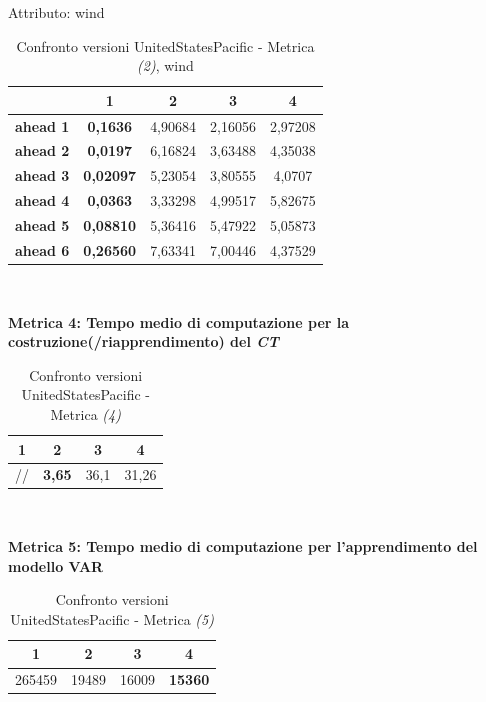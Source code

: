 \documentclass[12pt,a4paper,oneside,openright]{book}
\begin{document}
\medskip

Attributo: wind \\ 

\begin{table}[H]
\centering
\begin{tabular}{|c|c|c|c|c|}
\hline
& 1 & 2 & 3 & 4 \\
\hline
\textbf{ahead 1} & \textbf{0,1636} & 4,90684 & 2,16056 & 2,97208\\
\hline
\textbf{ahead 2} & \textbf{0,0197} & 6,16824 & 3,63488 & 4,35038\\
\hline
\textbf{ahead 3} & \textbf{0,02097} & 5,23054 & 3,80555 & 4,0707\\
\hline
\textbf{ahead 4} & \textbf{0,0363} & 3,33298 & 4,99517 & 5,82675\\
\hline
\textbf{ahead 5} & \textbf{0,08810} & 5,36416 & 5,47922 & 5,05873\\
\hline
\textbf{ahead 6} & \textbf{0,26560} & 7,63341 & 7,00446 & 4,37529\\
\hline
\end{tabular} \\
\caption{Confronto versioni UnitedStatesPacific - Metrica \textit{(2)}, wind}
\end{table} 

\medskip

\textbf{Metrica 4: Tempo medio di computazione per la costruzione(/riapprendimento) del \textit{CT}}

\medskip

\begin{table}[H]
\centering
\begin{tabular}[H]{|c|c|c|c|}
\hline
1 & 2 & 3 & 4\\
\hline
// & \textbf{3,65} & 36,1 & 31,26\\ 
\hline
\end{tabular} \\
\caption{Confronto versioni UnitedStatesPacific - Metrica \textit{(4)}}
\end{table}

\medskip

\textbf{Metrica 5: Tempo medio di computazione per l'apprendimento del modello VAR}

\medskip

\begin{table}[H]
\centering
\begin{tabular}[H]{|c|c|c|c|}
\hline
1 & 2 & 3 & 4\\
\hline
265459 & 19489 & 16009 & \textbf{15360}\\ 
\hline
\end{tabular} \\
\caption{Confronto versioni UnitedStatesPacific - Metrica \textit{(5)}}
\end{table}
\end{document}
